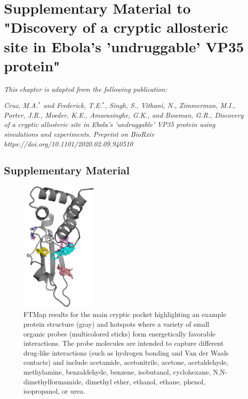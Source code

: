 \documentclass[../main.tex]{subfiles}
\begin{document}
	
	\graphicspath{{AppendixC/}}
	\chapter{Supplementary Material to "Discovery of a cryptic allosteric site in Ebola's 'undruggable' VP35 protein"}
	\label{ch:vp35-supp-info}
	
    \textit{This chapter is adapted from the following publication:}

    \textit{Cruz, M.A.$^*$ and Frederick, T.E.$^*$, Singh, S., Vithani, N., Zimmerman, M.I., Porter, J.R., Moeder, K.E., Amarasinghe, G.K., and Bowman, G.R., Discovery of a cryptic allosteric site in Ebola's 'undruggable' VP35 protein using simulations and experiments. Preprint on BioRxiv https://doi.org/10.1101/2020.02.09.940510}\cite{Cruz2020vp35}
	

\section{Supplementary Material}
    \begin{figure}[!htb] %
        \centering
        \includegraphics[width=1.5in]{ch5-suppfig1.png}
        \caption[FTMap results for the main cryptic pocket highlighting an example protein structure and hotspots where a variety of small organic probes form energetically favorable interactions.]
            {FTMap results for the main cryptic pocket highlighting an example protein structure (gray) and hotspots where a variety of small organic probes (multicolored sticks) form energetically favorable interactions. The probe molecules are intended to capture different drug-like interactions (such as hydrogen bonding and Van der Waals contacts) and include acetamide, acetonitrile, acetone, acetaldehyde, methylamine, benzaldehyde, benzene, isobutanol, cyclohexane, N,N-dimethylformamide, dimethyl ether, ethanol, ethane, phenol, isopropanol, or urea.}
        \label{fig:ch5-suppfig1}
    \end{figure}
\end{document}
